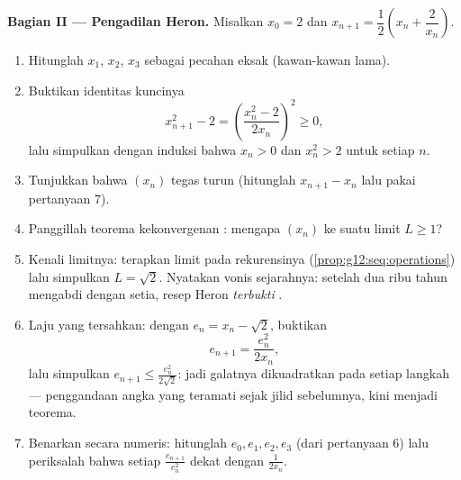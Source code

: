 \begin{problem}
\medskip
\noindent\textbf{Bagian II --- Pengadilan Heron.}
Misalkan $x_0 = 2$ dan $x_{n+1} = \dfrac12\left(x_n +
\dfrac{2}{x_n}\right)$.
\begin{enumerate}[resume]
  \item Hitunglah $x_1$, $x_2$, $x_3$ sebagai pecahan eksak (kawan-kawan
        lama).
  \item Buktikan identitas kuncinya
        \[
        x_{n+1}^2 - 2 = \left(\frac{x_n^2 - 2}{2x_n}\right)^{\!2}
        \geq 0,
        \]
        lalu simpulkan dengan induksi bahwa $x_n > 0$ dan
        $x_n^2 > 2$ untuk setiap $n$.
  \item Tunjukkan bahwa $(x_n)$ tegas turun (hitunglah
        $x_{n+1} - x_n$ lalu pakai pertanyaan 7).
  \item Panggillah teorema kekonvergenan : mengapa
        $(x_n)$  ke suatu limit $L \geq 1$?
  \item Kenali limitnya: terapkan limit pada rekurensinya
        (\cref{prop:g12:seq:operations}) lalu simpulkan
        $L = \sqrt2$. Nyatakan vonis sejarahnya: setelah dua
        ribu tahun mengabdi dengan setia, resep Heron
        \emph{terbukti} .
  \item Laju yang tersahkan: dengan $e_n = x_n - \sqrt2$, buktikan
        \[
        e_{n+1} = \frac{e_n^2}{2 x_n} ,
        \]
        lalu simpulkan $e_{n+1} \leq \frac{e_n^2}{2\sqrt2}$: jadi
        galatnya dikuadratkan pada setiap langkah --- penggandaan angka
        yang teramati sejak jilid sebelumnya, kini menjadi teorema.
  \item Benarkan secara numeris: hitunglah $e_0, e_1, e_2, e_3$ (dari
        pertanyaan 6) lalu periksalah bahwa setiap $\frac{e_{n+1}}{e_n^2}$
        dekat dengan $\frac{1}{2x_n}$.
\end{enumerate}


\end{problem}

